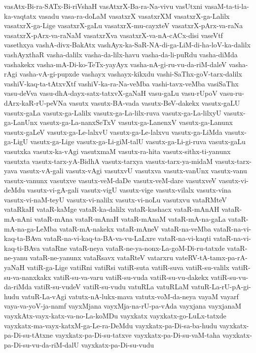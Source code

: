 {vasAtx-Bi-ra-SATx-Bi-riVshaH
vasAtxrX-Ba-ra-Na-vivu
vasUtxni
vasaM-ta-ti-la-ka-vaqtatx
vasadu
vasa-ra-doLaM
vasatxrX
vasatxrXM
vasatxrX-ga-Lalilx
vasatxrX-ga-Lige
vasatxrX-gaLu
vasatxrX-mu-cayxteV
vasatxrX-pArx-va-raNa
vasatxrX-pArx-va-raNaM
vasatxrXva
vasatxrX-va-nA-cACx-disi
vaseVtf
vasethxya
vashA-divx-BakAtx
vashAyx-ka-SaR-NA-di-ga-LiM-di-ha-loV-ka-dalilx
vashAyxthaR
vasha-dalilx
vasha-da-lilx-havu
vasha-da-li-puRdu
vasha-diMda
vashakekx
vasha-mA-Di-ko-TeTx-yayAyx
vasha-nA-gi-ru-vu-da-riM-daleV
vasha-rAgi
vasha-vA-gi-pupxde
vashayx
vashayx-kikxdu
vashi-SaThx-goV-tarx-dalilx
vashiV-kaq-ta-tAtxvXtf
vashiV-ka-ra-Na-veMba
vashi-tavx-veMba
vasiSaThx
vasu-deVva
vasu-dhA-dayx-satx-tatxvX-gaNaH
vasu-gaLu
vasu-rUpoV
vasu-ru-dArx-kaR-rU-peVNa
vasutx
vasutx-BA-vada
vasutx-BeV-dakekx
vasutx-gaLU
vasutx-gaLa
vasutx-ga-Lalilx
vasutx-ga-La-lilx-ruva
vasutx-ga-La-lilxyU
vasutx-ga-LanUnx
vasutx-ga-La-nanxSeTxV
vasutx-ga-LanenxV
vasutx-ga-Lanunx
vasutx-gaLeV
vasutx-ga-Le-lalxvU
vasutx-ga-Le-lalxvu
vasutx-ga-LiMda
vasutx-ga-LigU
vasutx-ga-Lige
vasutx-ga-Li-giM-talU
vasutx-ga-Li-gi-ruva
vasutx-gaLu
vasutxka
vasutx-ka-vAgi
vasutxmaM
vasutx-ra-hita
vasutx-sithx-ti-yanunx
vasutxta
vasutx-tarx-yA-BidhA
vasutx-tarxya
vasutx-tarx-ya-midaM
vasutx-tarx-yava
vasutx-vA-gali
vasutx-vAgi
vasutxvU
vasutxva
vasutx-vanUnx
vasutx-vanu
vasutx-vanunx
vasutxve
vasutx-veM-daDe
vasutx-veM-dare
vasutxveV
vasutx-vi-deMdu
vasutx-vi-gA-gali
vasutx-vigU
vasutx-vige
vasutx-vilalx
vasutx-vina
vasutx-vi-naM-teyU
vasutx-vi-nalilx
vasutx-vi-noLu
vasutxvu
vataRMteV
vataRkaH
vataR-kaMge
vataR-ka-dalilx
vataR-kashacx
vataR-mAnAH
vataR-mA-nAni
vataR-mAna
vataR-mAnaH
vataR-mAnaM
vataR-mA-na-gaLa
vataR-mA-na-ga-LeMba
vataR-mA-nakekx
vataR-mAneV
vataR-na-veMba
vataR-na-vi-kaq-ta-BAva
vataR-na-vi-kaq-ta-BA-va-vu-LaLxre
vataR-na-vi-kaqti
vataR-na-vi-kaq-ti-BAva
vataRne
vataR-neya
vataR-ne-ya-nonx-La-goM-Di-ru-tatxde
vataR-ne-yanu
vataR-ne-yanunx
vataRsavx
vataRteV
vatarxru
vateRV-tA-tamx-pa-rA-yaNaH
vatiR-ga-Lige
vatiRni
vatiRsi
vatiR-suta
vatiR-suva
vatiR-su-valilx
vatiR-su-va-nanxkakx
vatiR-su-va-varu
vatiR-su-vuda
vatiR-su-vu-dakekx
vatiR-su-vu-da-riMda
vatiR-su-vudeV
vatiR-su-vudu
vatuRLa
vatuRLaM
vatuR-La-rU-pA-gi-hudu
vatuR-La-vAgi
vatutx-nA-lukx-mava
vatutx-voM-da-neya
vayaM
vayarf
vaya-va-yoV-ja-namf
vayxMjana
vayxMja-na-rU-pa-vAda
vayxjana
vayxjanaM
vayxkAtx-vayx-katx-va-no-La-koMDu
vayxkatx
vayxkatx-go-LuLx-tatxde
vayxkatx-ma-vayx-katxM-ga-Le-ra-DeMdu
vayxkatx-pa-Di-sa-ba-hudu
vayxkatx-pa-Di-su-tAtxne
vayxkatx-pa-Di-su-tatxve
vayxkatx-pa-Di-su-vaM-taha
vayxkatx-pa-Di-su-vu-da-riM-dalU
vayxkatx-pa-Di-su-vudu
}
